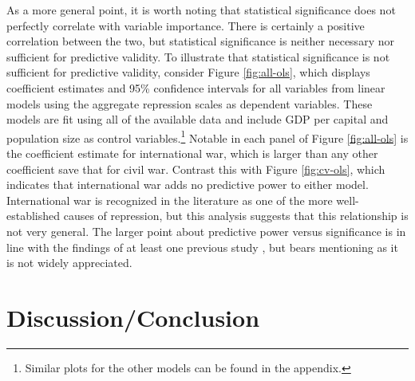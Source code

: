 \documentclass[12pt]{article}
\begin{document}
As a more general point, it is worth noting that statistical significance does not perfectly correlate with variable importance. There is certainly a positive correlation between the two, but statistical significance is neither necessary nor sufficient for predictive validity. To illustrate that statistical significance is not sufficient for predictive validity, consider Figure \ref{fig:all-ols}, which displays coefficient estimates and 95\% confidence intervals for all variables from linear models using the aggregate repression scales as dependent variables. These models are fit using all of the available data and include GDP per capital and population size as control variables.\footnote{Similar plots for the other models can be found in the appendix.}  Notable in each panel of Figure \ref{fig:all-ols} is the coefficient estimate for international war, which is larger than any other coefficient save that for civil war. Contrast this with Figure \ref{fig:cv-ols}, which indicates that international war adds no predictive power to either model. International war is recognized in the literature as one of the more well-established causes of repression, but this analysis suggests that this relationship is not very general. The larger point about predictive power versus significance is in line with the findings of at least one previous study \citep{Wardetal2010}, but bears mentioning as it is not widely appreciated.

\section{Discussion/Conclusion}
\end{document}
